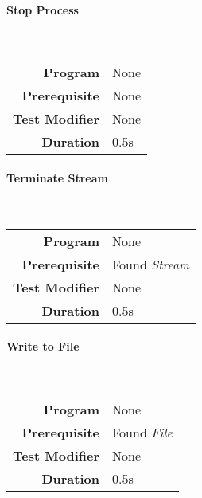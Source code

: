 \hfill

\paragraph{Stop Process}
\label{par: stop process}

\mbox{}\\

\begin{tabular}{rl}
    \textbf{Program}       & None \\
    \textbf{Prerequisite}  & None \\
    \textbf{Test Modifier} & None \\
    \textbf{Duration}      & 0.5s \\
\end{tabular}

\hfill


\paragraph{Terminate Stream}
\label{par: terminate stream}

\mbox{}\\

\begin{tabular}{rl}
    \textbf{Program}       & None                \\
    \textbf{Prerequisite}  & Found \emph{Stream} \\
    \textbf{Test Modifier} & None                \\
    \textbf{Duration}      & 0.5s                \\
\end{tabular}

\hfill

\paragraph{Write to File}
\label{par: write file}

\mbox{}\\

\begin{tabular}{rl}
    \textbf{Program}       & None              \\
    \textbf{Prerequisite}  & Found \emph{File} \\
    \textbf{Test Modifier} & None              \\
    \textbf{Duration}      & 0.5s              \\
\end{tabular}

